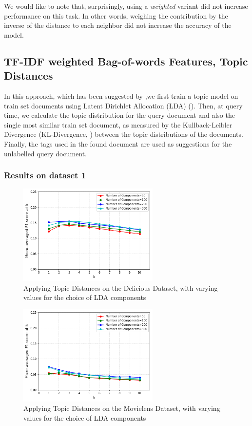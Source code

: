  We would like to note that, surprisingly, using a \textit{weighted} variant did not increase performance on this task. In other words, weighing the contribution by the inverse of the distance to each neighbor did not increase the accuracy of the model.

\subsection{TF-IDF weighted Bag-of-words Features, Topic Distances}

In this approach, which has been suggested by \cite{choubey_2011},we first train a topic model on train set documents using Latent Dirichlet Allocation (LDA) (\cite{blei_etal_2003}). Then, at query time, we calculate the topic distribution for the query document and also the single most similar train set document, as measured by the Kullback-Leibler Divergence (KL-Divergence, \cite{kullback_leibler_1951}) between the topic distributions of the documents. Finally, the tags used in the found document are used as suggestions for the unlabelled query document.

\subsubsection{Results on dataset 1}

\begin{figure}[H]
    \centering
    \includegraphics[width=7cm]{chapters/05_experiments/images/delicious-topic-distances.png}
    \caption{Applying Topic Distances on the Delicious Dataset, with varying values for the choice of LDA components}
    \label{fig:topic_distances_delicious}
\end{figure}

\begin{figure}[H]
    \centering
    \includegraphics[width=7cm]{chapters/05_experiments/images/movielens-topic-distances.png}
    \caption{Applying Topic Distances on the Movielens Dataset, with varying values for the choice of LDA components}
    \label{fig:topic_distances_movielens}
\end{figure}

